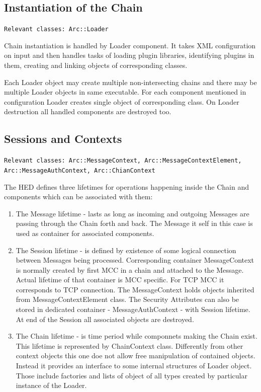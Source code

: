 \documentclass{book}
\begin{document}
\subsection{Instantiation of the Chain}

\texttt{Relevant classes: Arc::Loader}

Chain instantiation is handled by Loader component. It takes XML configuration on input and then handles tasks of loading plugin libraries, identifying plugins in them, creating and linking objects of corresponding classes.

Each Loader object may create multiple non-intersecting chains and there may be multiple Loader objects in same executable. For each component mentioned in configuration Loader creates single object of corresponding class. On Loader destruction all handled components are destroyed too.


\subsection{Sessions and Contexts}

\texttt{Relevant classes: Arc::MessageContext, Arc::MessageContextElement, Arc::MessageAuthContext, Arc::ChianContext }

The HED defines three lifetimes for operations happening inside the Chain and components which can be associated with them:


\begin{enumerate}

\item The Message lifetime - lasts as long as incoming and outgoing Messages are passing through the Chain forth and back. The Message it self in this case is used as container for associated components.

\item The Session lifetime - is defined by existence of some logical connection between Messages being processed. Corresponding container MessageContext is normally created by first MCC in a chain and attached to the Message. Actual lifetime of that container is MCC specific. For TCP MCC it corresponds to TCP connection. The MessageContext holds objects inherited from MessageContextElement class. The Security Attributes can also be stored in dedicated container - MessageAuthContext - with Session lifetime. At end of  the Session all associated objects are destroyed.

\item The Chain lifetime - is time period while componnets making the Chain exist. This lifetime is represented by ChainContext class. Differently from other context objects this one doe not allow free manipulation of contained objects. Instead it provides an interface to some internal structures of Loader object. Those include factories and lists of object of all types created by particular instance of the Loader.

\end{enumerate}
\end{document}
